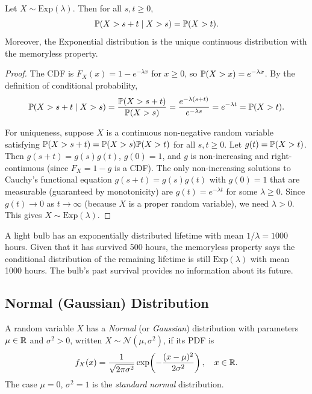 \documentclass[11pt,a4paper]{article}
\begin{document}
\begin{theorem}
\label{thm:memoryless}
Let $X \sim \mathrm{Exp}(\lambda)$. Then for all $s, t \geq 0$,
\[
    \mathbb{P}(X > s + t \mid X > s) = \mathbb{P}(X > t).
\]
Moreover, the Exponential distribution is the unique continuous
distribution with the memoryless property.
\end{theorem}

\begin{proof}
The CDF is $F_X(x) = 1 - e^{-\lambda x}$ for $x \geq 0$, so
$\mathbb{P}(X > x) = e^{-\lambda x}$. By the definition of conditional
probability,
\[
    \mathbb{P}(X > s + t \mid X > s)
    = \frac{\mathbb{P}(X > s + t)}{\mathbb{P}(X > s)}
    = \frac{e^{-\lambda(s+t)}}{e^{-\lambda s}}
    = e^{-\lambda t}
    = \mathbb{P}(X > t).
\]

For uniqueness, suppose $X$ is a continuous non-negative random variable
satisfying $\mathbb{P}(X > s + t) = \mathbb{P}(X > s)\mathbb{P}(X > t)$ for all
$s, t \geq 0$. Let $g(t) = \mathbb{P}(X > t)$. Then $g(s + t) = g(s)g(t)$,
$g(0) = 1$, and $g$ is non-increasing and right-continuous (since
$F_X = 1 - g$ is a CDF). The only non-increasing solutions to
Cauchy's functional equation $g(s+t) = g(s)g(t)$ with $g(0) = 1$ that
are measurable (guaranteed by monotonicity) are $g(t) = e^{-\lambda t}$
for some $\lambda \geq 0$. Since $g(t) \to 0$ as $t \to \infty$
(because $X$ is a proper random variable), we need $\lambda > 0$.
This gives $X \sim \mathrm{Exp}(\lambda)$.
\end{proof}

\begin{example}
\label{ex:exponential_waiting}
A light bulb has an exponentially distributed lifetime with mean
$1/\lambda = 1000$ hours. Given that it has survived 500 hours, the
memoryless property says the conditional distribution of the remaining
lifetime is still $\mathrm{Exp}(\lambda)$ with mean 1000 hours. The
bulb's past survival provides no information about its future.
\end{example}

\subsection{Normal (Gaussian) Distribution}

\begin{definition}
\label{def:normal}
A random variable $X$ has a \emph{Normal} (or \emph{Gaussian})
distribution with parameters $\mu \in \mathbb{R}$ and $\sigma^2 > 0$, written
$X \sim \mathcal{N}(\mu, \sigma^2)$, if its PDF is
\[
    f_X(x) = \frac{1}{\sqrt{2\pi\sigma^2}}
    \exp\!\left(-\frac{(x - \mu)^2}{2\sigma^2}\right),
    \quad x \in \mathbb{R}.
\]
The case $\mu = 0$, $\sigma^2 = 1$ is the \emph{standard normal}
distribution.
\end{definition}
\end{document}
